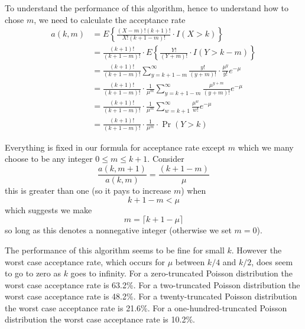 \documentclass[11pt]{article}
\begin{document}
To understand the performance of this algorithm, hence to understand how to chose $m$, we need
to calculate the acceptance rate
\begin{align*}
   a(k, m)
   & =
   E \left\{
   \frac{(X - m) ! (k + 1) !}{ X ! (k + 1 - m) !} \cdot I(X > k)
   \right\}
   \\
   & =
   \frac{(k + 1) !}{ (k + 1 - m) !} \cdot
   E \left\{
   \frac{Y !}{ (Y + m) !} \cdot I(Y > k - m)
   \right\}
   \\
   & =
   \frac{(k + 1) !}{ (k + 1 - m) !}
   \sum_{y = k + 1 - m}^\infty
   \frac{y !}{ (y + m) !} \cdot \frac{\mu^y}{y !} e^{-\mu}
   \\
   & =
   \frac{(k + 1) !}{ (k + 1 - m) !}
   \cdot \frac{1}{\mu^m}
   \sum_{y = k + 1 - m}^\infty
   \frac{\mu^{y + m}}{(y + m) !} e^{-\mu}
   \\
   & =
   \frac{(k + 1) !}{ (k + 1 - m) !}
   \cdot \frac{1}{\mu^m}
   \sum_{w = k + 1}^\infty
   \frac{\mu^w}{w !} e^{-\mu}
   \\
   & =
   \frac{(k + 1) !}{ (k + 1 - m) !}
   \cdot \frac{1}{\mu^m}
   \cdot \Pr(Y > k)
\end{align*}

Everything is fixed in our formula for acceptance rate except $m$ which we many choose
to be any integer $0 \le m \le k + 1$.  Consider
$$
   \frac{a(k, m + 1)}{a(k, m)}
   =
   \frac{(k + 1 - m)}{\mu}
$$
this is greater than one (so it pays to increase $m$) when
$$
   k + 1 - m < \mu
$$
which suggests we make
$$
   m = \lceil k + 1 - \mu \rceil
$$
so long as this denotes a nonnegative integer (otherwise we set $m = 0$).

The performance of this algorithm seems to be fine for small $k$.
However the worst case acceptance rate, which occurs for $\mu$ between $k / 4$ and $k / 2$,
does seem to go to zero as $k$ goes to infinity.
For a zero-truncated Poisson distribution the worst case acceptance rate is 63.2\%.
For a two-truncated Poisson distribution the worst case acceptance rate is 48.2\%.
For a twenty-truncated Poisson distribution the worst case acceptance rate is 21.6\%.
For a one-hundred-truncated Poisson distribution the worst case acceptance rate is 10.2\%.
\end{document}
